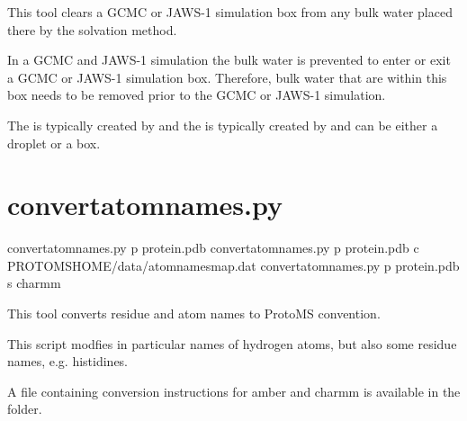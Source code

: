 \documentclass[letterpaper,10pt,english]{sphinxmanual}
\begin{document}
%
\begin{sphinxVerbatim}[commandchars=\\\{\}]
    
      
\end{sphinxVerbatim}


This tool clears a GCMC or JAWS-1 simulation box from any bulk water placed there by the solvation method.

In a GCMC and JAWS-1 simulation the bulk water is prevented to enter or exit a GCMC or JAWS-1 simulation box. Therefore, bulk water that are within this box needs to be removed prior to the GCMC or JAWS-1 simulation.

The  is typically created by  and the  is typically created by  and can be either a droplet or a box.


\section{convertatomnames.py}
\label{\detokenize{tools:convertatomnames-py}}

%
\begin{sphinxVerbatim}[commandchars=\\\{\}]
convertatomnames.py \PYGZhy{}p protein.pdb
convertatomnames.py \PYGZhy{}p protein.pdb \PYGZhy{}c \PYGZdl{}PROTOMSHOME/data/atomnamesmap.dat
convertatomnames.py \PYGZhy{}p protein.pdb \PYGZhy{}s charmm
\end{sphinxVerbatim}


This tool converts residue and atom names to ProtoMS convention.

This script modfies in particular names of hydrogen atoms, but also some residue names, e.g. histidines.

A file containing conversion instructions for amber and charmm is available in the  folder.
\end{document}
